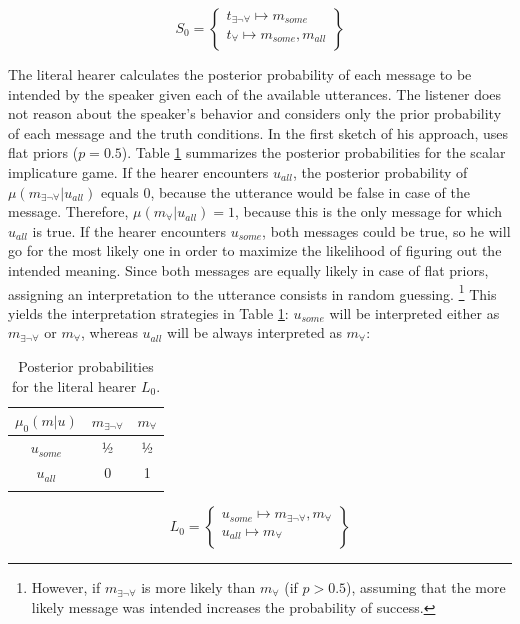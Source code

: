 \begin{equation}
S_0 = \begin{Bmatrix} t_{\exists\neg\forall} \mapsto m_{some}\\
        t_{\forall} \mapsto m_{some}, m_{all}\\
       \end{Bmatrix}
\end{equation}

The literal hearer calculates the posterior probability of each message to be intended by the speaker given each of the available utterances. The listener does not reason about the speaker's behavior and considers only the prior probability of each message and the truth conditions. In the first sketch of his approach, \citet{franke2009} uses flat priors ($p = 0.5$). Table \ref{tab:gt-si-l0} summarizes the posterior probabilities for the scalar implicature game. If the hearer encounters $u_{all}$, the posterior probability of $\mu(m_{\exists\neg\forall}|u_{all})$ equals 0, because the utterance would be false in case of the message. Therefore, $\mu(m_{\forall}|u_{all}) = 1$, because this is the only message for which $u_{all}$ is true. If the hearer encounters $u_{some}$, both messages could be true, so he will go for the most likely one in order to maximize the likelihood of figuring out the intended meaning. Since both messages are equally likely in case of flat priors, assigning an interpretation to the utterance consists in random guessing.%
%
\footnote{However, if $m_{\exists\neg\forall}$ is more likely than $m_{\forall}$ (if $p > 0.5$), assuming that the more likely message was intended increases the probability of success.}\afterfn%
%
This yields the interpretation strategies in Table \ref{tab:gt-si-l0}: $u_{some}$ will be interpreted either as $m_{\exists\neg\forall}$ or $m_{\forall}$, whereas $u_{all}$ will be always interpreted as $m_{\forall}$:

\begin{table}[t]
\begin{tabular}{c c c}
 \lsptoprule
 $\mu_0(m|u)$ & $m_{\exists\neg\forall}$ & $m_{\forall}$\\
\midrule
$u_{some}$ & ½ & ½ \\
$u_{all}$ & 0 & 1\\
\lspbottomrule
\end{tabular}
\caption{Posterior probabilities for the literal hearer $L_0$.\label{tab:gt-si-l0}}
\end{table}
%
\largerpage
%
\begin{equation}\label{eq:l0}
 L_0 = \begin{Bmatrix} u_{some} \mapsto m_{\exists\neg\forall},m_{\forall}   \\
        u_{all} \mapsto m_{\forall}\\
       \end{Bmatrix}
\end{equation}

